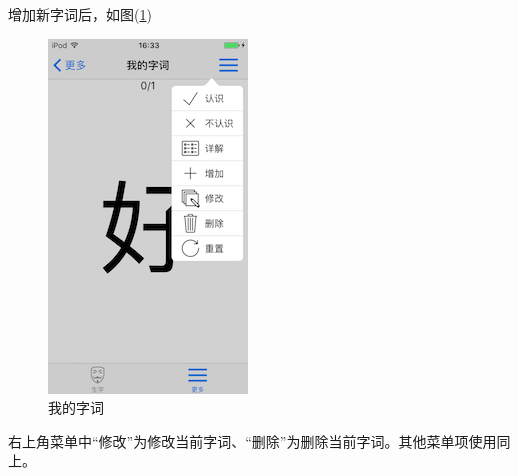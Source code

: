增加新字词后，如图(\ref{img9})
\begin{figure}[H]
	\centering
	\includegraphics{img/9.png}
	\caption{我的字词}
	\label{img9}
\end{figure}

右上角菜单中“修改”为修改当前字词、“删除”为删除当前字词。其他菜单项使用同上。

